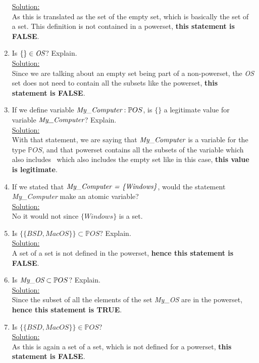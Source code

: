 \begin{enumerate}
  \noindent\underline{Solution:}\\ As this is translated as the set of the empty set, which is basically the set of a set. This definition is not contained in a powerset, \textbf{this statement is FALSE}.
  \item Is $\{ \} \in \emph{OS}$? Explain.\\
  \noindent\underline{Solution:}\\ Since we are talking about an empty set being part of a non-powerset, the \emph{OS} set does not need to contain all the subsets like the powerset, \textbf{this statement is FALSE}.
  \item If we define variable $\emph{My\_Computer} : \mathbb{P}OS$, is $\{ \}$ a legitimate value for variable  $\emph{My\_Computer}$? Explain.\\
  \noindent\underline{Solution:}\\ With that statement, we are saying that $\emph{My\_Computer}$ is a variable for the type $\mathbb{P}OS$, and that powerset contains all the subsets of the variable which also includes \
  which also includes the empty set like in this case, \textbf{this value is legitimate}.
  \item If we stated that $\emph{{My\_Computer} = \{Windows\}}$, would the statement \emph{My\_Computer} make an atomic variable?\\
  \noindent\underline{Solution:}\\ No it would not since  $\{Windows\}$ is a set.
  \item Is $\{\{BSD, MacOS\}\} \subset \mathbb{P}OS$? Explain.\\
  \noindent\underline{Solution:}\\ A set of a set is not defined in the powerset, \textbf{hence this statement is FALSE}.
  \item Is $\emph{My\_OS} \subset \mathbb{P}OS$? Explain.\\
  \noindent\underline{Solution:}\\ Since the subset of all the elements of the set \emph{My\_OS} are in the powerset, \textbf{hence this statement is TRUE}.
  \item Is $\{{\{BSD, MacOS\}\}} \in \mathbb{P}OS$?\\
  \noindent\underline{Solution:}\\ As this is again a set of a set, which is not defined for a powerset, \textbf{this statement is FALSE}.

  

\end{enumerate}

